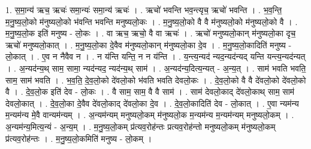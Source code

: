 \documentclass[17pt]{extarticle}
\begin{document}
1. स॒मा॒न्य॑ ऋच॒ ऋचः॑ समा॒न्यः॑ समा॒न्य॑ ऋचः॑ । . ऋचो॑ भवन्ति भव॒न्त्यृच॒ ऋचो॑ भवन्ति । . भ॒व॒न्ति॒ म॒नु॒ष्य॒लो॒को म॑नुष्यलो॒को भ॑वन्ति भवन्ति मनुष्यलो॒कः । . म॒नु॒ष्य॒लो॒को वै वै म॑नुष्यलो॒को म॑नुष्यलो॒को वै । . म॒नु॒ष्य॒लो॒क इति॑ मनुष्य - लो॒कः । . वा ऋच॒ ऋचो॒ वै वा ऋचः॑ । . ऋचो॑ मनुष्यलो॒कान् म॑नुष्यलो॒का दृच॒ ऋचो॑ मनुष्यलो॒कात् । . म॒नु॒ष्य॒लो॒का दे॒वैव म॑नुष्यलो॒कान् म॑नुष्यलो॒का दे॒व । . म॒नु॒ष्य॒लो॒कादिति॑ मनुष्य - लो॒कात् । . ए॒व न नैवैव न । . न य॑न्ति यन्ति॒ न न य॑न्ति । . य॒न्त्य॒न्यद॑ न्यद॒न्यद॑न्यद् यन्ति यन्त्य॒न्यद॑न्यत् । . अ॒न्यद॑न्य॒थ् साम॒ सामा॒ न्यद॑न्यद॒ न्यद॑न्य॒थ् साम॑ । . अ॒न्यद॑न्य॒दित्य॒न्यत् - अ॒न्य॒त् । . साम॑ भवति भवति॒ साम॒ साम॑ भवति । . भ॒व॒ति॒ दे॒व॒लो॒को दे॑वलो॒को भ॑वति भवति देवलो॒कः । . दे॒व॒लो॒को वै वै दे॑वलो॒को दे॑वलो॒को वै । . दे॒व॒लो॒क इति॑ देव - लो॒कः । . वै साम॒ साम॒ वै वै साम॑ । . साम॑ देवलो॒काद् दे॑वलो॒काथ् साम॒ साम॑ देवलो॒कात् । . दे॒व॒लो॒का दे॒वैव दे॑वलो॒काद् दे॑वलो॒का दे॒व । . दे॒व॒लो॒कादिति॑ देव - लो॒कात् । . ए॒वा न्यम॑न्य म॒न्यम॑न्य मे॒वै वान्यम॑न्यम् । . अ॒न्यम॑न्यम् मनुष्यलो॒कम् म॑नुष्यलो॒क म॒न्यम॑न्य म॒न्यम॑न्यम् मनुष्यलो॒कम् । . अ॒न्यम॑न्य॒मित्य॒न्यं - अ॒न्य॒म् । . म॒नु॒ष्य॒लो॒कम् प्र॑त्यव॒रोह॑न्तः प्रत्यव॒रोह॑न्तो मनुष्यलो॒कम् म॑नुष्यलो॒कम् प्र॑त्यव॒रोह॑न्तः । . म॒नु॒ष्य॒लो॒कमिति॑ मनुष्य - लो॒कम् । \newline
\end{document}
